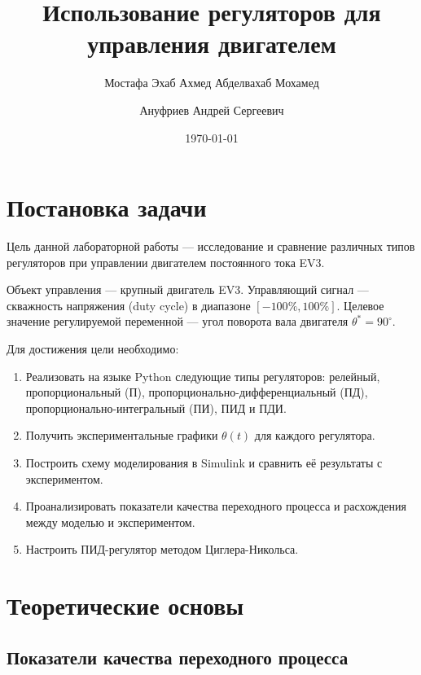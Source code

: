 \documentclass[a4paper, 12pt]{article}
\title{
Использование регуляторов для управления двигателем
}
\author{Мостафа Эхаб Ахмед Абделвахаб Мохамед}
\affil{503341}
\author{Ануфриев Андрей Сергеевич}
\affil{465029}
\date{\today}
\begin{document}
\maketitle

\newpage
\tableofcontents
\newpage

\section{Постановка задачи}

Цель данной лабораторной работы --- исследование и сравнение различных типов регуляторов
при управлении двигателем постоянного тока EV3.

Объект управления --- крупный двигатель EV3. Управляющий сигнал --- скважность напряжения
(duty cycle) в диапазоне $[-100\%, 100\%]$. Целевое значение регулируемой переменной ---
угол поворота вала двигателя $\theta^* = 90^\circ$.

Для достижения цели необходимо:
\begin{enumerate}
    \item Реализовать на языке Python следующие типы регуляторов:
    релейный, пропорциональный (П), пропорционально-дифференциальный (ПД),
    пропорционально-интегральный (ПИ), ПИД и ПДИ.
    \item Получить экспериментальные графики $\theta(t)$ для каждого регулятора.
    \item Построить схему моделирования в Simulink и сравнить её результаты с экспериментом.
    \item Проанализировать показатели качества переходного процесса и расхождения
    между моделью и экспериментом.
    \item Настроить ПИД-регулятор методом Циглера-Никольса.
\end{enumerate}

\newpage
\section{Теоретические основы}

\subsection{Показатели качества переходного процесса}
\end{document}
